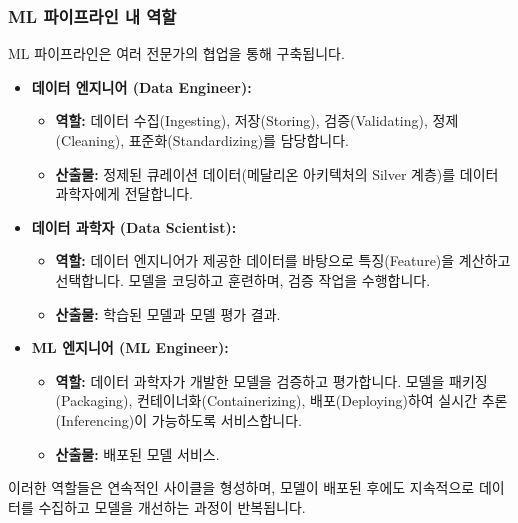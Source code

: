 \documentclass[11pt,a4paper]{article}
\begin{document}
\subsubsection*{ML 파이프라인 내 역할}
ML 파이프라인은 여러 전문가의 협업을 통해 구축됩니다.
\begin{itemize}
    \item \textbf{데이터 엔지니어 (Data Engineer):}
    \begin{itemize}
        \item \textbf{역할:} 데이터 수집(Ingesting), 저장(Storing), 검증(Validating), 정제(Cleaning), 표준화(Standardizing)를 담당합니다.
        \item \textbf{산출물:} 정제된 큐레이션 데이터(메달리온 아키텍처의 Silver 계층)를 데이터 과학자에게 전달합니다.
    \end{itemize}
    \item \textbf{데이터 과학자 (Data Scientist):}
    \begin{itemize}
        \item \textbf{역할:} 데이터 엔지니어가 제공한 데이터를 바탕으로 특징(Feature)을 계산하고 선택합니다. 모델을 코딩하고 훈련하며, 검증 작업을 수행합니다.
        \item \textbf{산출물:} 학습된 모델과 모델 평가 결과.
    \end{itemize}
    \item \textbf{ML 엔지니어 (ML Engineer):}
    \begin{itemize}
        \item \textbf{역할:} 데이터 과학자가 개발한 모델을 검증하고 평가합니다. 모델을 패키징(Packaging), 컨테이너화(Containerizing), 배포(Deploying)하여 실시간 추론(Inferencing)이 가능하도록 서비스합니다.
        \item \textbf{산출물:} 배포된 모델 서비스.
    \end{itemize}
\end{itemize}
이러한 역할들은 연속적인 사이클을 형성하며, 모델이 배포된 후에도 지속적으로 데이터를 수집하고 모델을 개선하는 과정이 반복됩니다.
\end{document}
